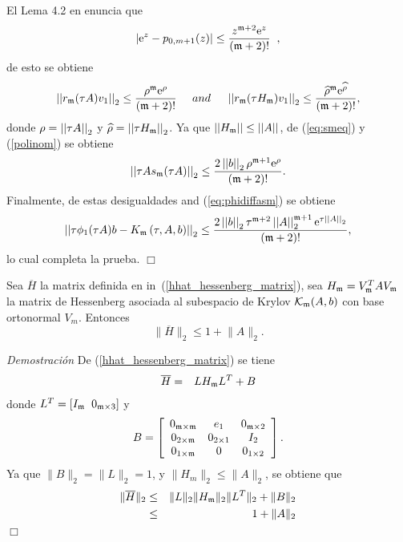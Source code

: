 El Lema 4.2 en \cite{Saad92} enuncia que
\[ \left\lvert \mathrm{e}^{z}-p_{0,m+1}(z) \right\rvert \leq \frac{z^{\mathfrak{m}+2}\mathrm{e}^{z}}{(\mathfrak{m}+2)!}\;\;, \]
de esto se obtiene
\begin{equation}
\left\lvert \left\lvert r_{\mathfrak{m}}(\tau A)v_1 \right\rvert \right\rvert_2\leq \frac{\rho^{\mathfrak{m}}\mathrm{e}^{\rho}}{(\mathfrak{m}+2)!}\;\;\;\;\; and \;\;\;\;\; \left\lvert \left\lvert r_{\mathfrak{m}}(\tau H_{\mathfrak{m}})v_1 \right\rvert \right\rvert_2\leq \frac{\widehat{\rho}^{\mathfrak{m}}\mathrm{e}^{\widehat{\rho}}}{(\mathfrak{m}+2)!}, \label{polinom}
\end{equation}
donde $\rho=\left\lvert \left\lvert \tau A \right\rvert \right\rvert_2 $ y  $\widehat{\rho}=\left\lvert \left\lvert \tau H_{\mathfrak{m}} \right\rvert \right\rvert_2$. Ya que $\left\lvert \left\lvert H_{\mathfrak{m}} \right\rvert \right\rvert\leq\left\lvert \left\lvert A \right\rvert \right\rvert$, de (\ref{eq:smeq}) y (\ref{polinom}) se obtiene
\begin{equation*}
\left\lvert \left\lvert \tau As_{\mathfrak{m}}(\tau A) \right\rvert \right\rvert_2  \leq \frac{2 \left\lvert \left\lvert b \right\rvert \right\rvert_2\rho^{\mathfrak{m}+1}\mathrm{e}^{\rho}}{(\mathfrak{m}+2)!}.
\end{equation*}
Finalmente, de estas desigualdades and (\ref{eq:phidiffasm}) se obtiene
\begin{equation*}
\left\lvert \left\lvert \tau\phi_1(\tau A)b - K_{\mathfrak{m}}\left(\tau,A , b \right) \right\rvert \right\rvert_2  \leq
\frac{2 \left\lvert \left\lvert b \right\rvert \right\rvert_2\tau^{\mathfrak{m}+2}\left\lvert \left\lvert A \right\rvert \right\rvert_2^{\mathfrak{m}+1}\mathrm{e}^{\tau \left\lvert \left\lvert A \right\rvert \right\rvert_2}}{(\mathfrak{m}+2)!},
\end{equation*}
lo cual completa la prueba. $\Box$

\begin{lemma}\cite{naranjo2021locally}\label{H-bound}
	Sea $\overline{H}$ la matrix definida en in~(\ref{hhat_hessenberg_matrix}), sea  $H_{\mathfrak{m}}=V^{T}_{\mathfrak{m}} AV_{\mathfrak{m}}$ la matrix de Hessenberg asociada al subespacio de Krylov $\mathcal{K}_{\mathfrak{m}}(A,b)$ con base ortonormal $V_m$. Entonces
	\[ \lVert\overline{H}\rVert_2 \leq 1 +  \lVert A\rVert_2. \]
\end{lemma}
\emph{Demostración}
De (\ref{hhat_hessenberg_matrix}) se tiene
\begin{eqnarray*}
	\overline{H}&=&L H_{\mathfrak{m}} L^T + B
\end{eqnarray*}
donde $ L^T=[I_{\mathfrak{m}} \;\; 0_{\mathfrak{m}\times 3}] $ y
\[B=\left[\begin{array}{ccc}
0_{\mathfrak{m}\times\mathfrak{m}} & e_1 & 0_{\mathfrak{m} \times 2}\\
0_{2\times\mathfrak{m}} & 0_{2 \times 1} & I_2\\
0_{1\times\mathfrak{m}} & 0 & 0_{1\times 2}
\end{array}\right].\]
Ya que $\lVert B\rVert_2 = \lVert L \rVert_2 = 1$, y $\lVert H_m\rVert_2 \le \lVert A \rVert_2$, se obtiene que
\begin{eqnarray*}
	\lVert\overline{H}\rVert_2 &\leq& \lVert L \rVert_2 \lVert H_{\mathfrak{m}} \rVert_2 \lVert L^T \rVert_2 + \lVert B \rVert_2\\
	&\leq& 1 + \lVert A\rVert_2
\end{eqnarray*}
$\Box$\\ \\


